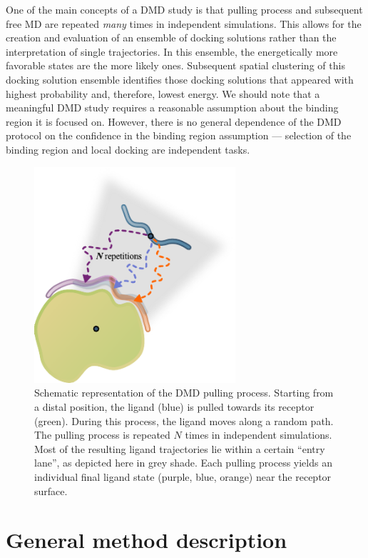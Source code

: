 One of the main concepts of a DMD study is that pulling process and subsequent
free MD are repeated \textit{many} times in independent simulations. This allows
for the creation and evaluation of an ensemble of docking solutions rather than
the interpretation of single trajectories. In this ensemble, the energetically
more favorable states are the more likely ones. Subsequent spatial clustering of
this docking solution ensemble identifies those docking solutions that appeared
with highest probability and, therefore, lowest energy. We should note that a
meaningful DMD study requires a reasonable assumption about the binding region
it is focused on. However, there is no general dependence of the DMD protocol on
the confidence in the binding region assumption --- selection of the binding
region and local docking are independent tasks.

\begin{figure}
\centering
\includegraphics[height=8cm]{gfx/dmd/scheme_n_repetitions_for_thesis_002.pdf}
\caption[]{Schematic representation of the DMD pulling process. Starting from a
distal position, the ligand (blue) is pulled towards its receptor (green).
During this process, the ligand moves along a random path. The pulling process
is repeated $N$ times in independent simulations. Most of the resulting ligand
trajectories lie within a certain \enquote{entry lane}, as depicted here in grey
shade. Each pulling process yields an individual final ligand state (purple,
blue, orange) near the receptor surface.}
\label{fig:dmd:n_repetitions}
\end{figure}


\section{General method description}
